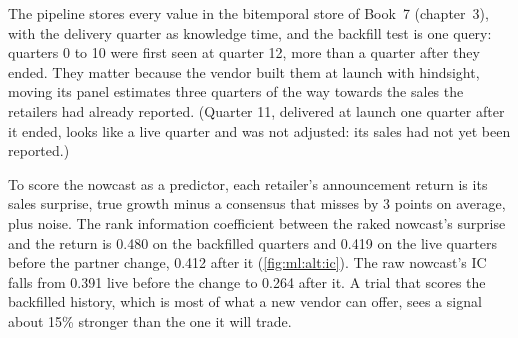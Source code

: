 The pipeline stores every value in the bitemporal store of Book~7 (chapter~3), with the delivery quarter as knowledge time,
and the backfill test is one query: quarters 0 to 10 were first seen at quarter 12, more than a quarter after they ended.
They matter because the vendor built them at launch with hindsight, moving its panel estimates three quarters of the way
towards the sales the retailers had already reported. (Quarter 11, delivered at launch one quarter after it ended, looks
like a live quarter and was not adjusted: its sales had not yet been reported.)

To score the nowcast as a predictor, each retailer's announcement return is its sales surprise, true growth minus a
consensus that misses by 3 points on average, plus noise. The rank information coefficient between the raked nowcast's
surprise and the return is 0.480 on the backfilled quarters and 0.419 on the live quarters before the partner change, 0.412
after it (\cref{fig:ml:alt:ic}). The raw nowcast's IC falls from 0.391 live before the change to 0.264 after it. A trial
that scores the backfilled history, which is most of what a new vendor can offer, sees a signal about 15\% stronger than
the one it will trade.

\begin{omfigure}

\label{fig:ml:alt:ic}
\end{omfigure}

